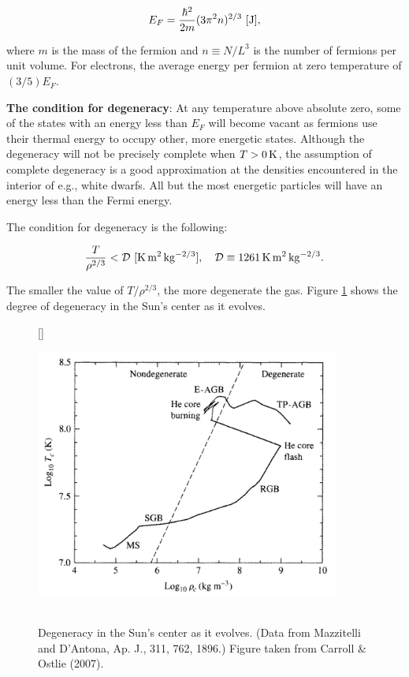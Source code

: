 \documentclass[a4paper,10pt]{article}
\begin{document}
\begin{align*}
    E_F = \frac{\hbar^2}{2m} (3\pi^2n)^{2/3} ~ [{\rm J}],
\end{align*}

{\noindent}where $m$ is the mass of the fermion and $n\equiv N/L^3$ is the number of fermions per unit volume. For electrons, the average energy per fermion at zero temperature of $(3/5)E_F$.

{\noindent}\textbf{The condition for degeneracy}: At any temperature above absolute zero, some of the states with an energy less than $E_F$ will become vacant as fermions use their thermal energy to occupy other, more energetic states. Although the degeneracy will not be precisely complete when $T>0\,{\rm K}$, the assumption of complete degeneracy is a good approximation at the densities encountered in the interior of e.g., white dwarfs. All but the most energetic particles will have an energy less than the Fermi energy.

{\noindent}The condition for degeneracy is the following:

\begin{align*}
    \frac{T}{\rho^{2/3}} < \mathcal{D} ~ [{\rm K\,m^2\,kg^{-2/3}}], ~~~ \mathcal{D} \equiv 1261\,{\rm K\,m^2\,kg^{-2/3}}. 
\end{align*}

{\noindent}The smaller the value of $T/\rho^{2/3}$, the more degenerate the gas. Figure \ref{fig:solardegeneracyevolution} shows the degree of degeneracy in the Sun's center as it evolves.

\begin{figure}[t]
    [\FBwidth]
    {\caption{\footnotesize{\\Degeneracy in the Sun's center as it evolves. (Data from Mazzitelli and D'Antona, Ap. J., 311, 762, 1896.) Figure taken from Carroll \& Ostlie (2007).}}
    \label{fig:solardegeneracyevolution}}
    {\includegraphics[width=10cm]{figures/SolarDegeneracyEvolution.png}}
\end{figure}
\end{document}
